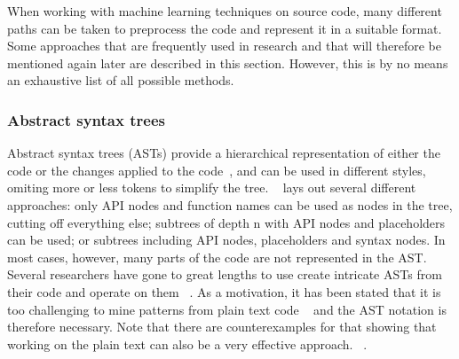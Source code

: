 \documentclass[
a4paper,
pagesize,
pdftex,
12pt,
twoside, %
BCOR=5mm, %
ngerman,
fleqn,
final,
]{scrartcl}
\begin{document}
	When working with machine learning techniques on source code, many different paths can be taken to preprocess the code and represent it in a suitable format. Some approaches that are frequently used in research and that will therefore be mentioned again later are described in this section. However, this is by no means an exhaustive list of all possible methods. 
	
	\subsubsection{Abstract syntax trees}
	Abstract syntax trees (ASTs) provide a hierarchical representation of either the code or the changes applied to the code~\cite{Liu.2018}, and can be used in different styles, omiting more or less tokens to simplify the tree. ~\cite{Yamaguchi.2012} lays out several different approaches: only API nodes and function names can be used as nodes in the tree, cutting off everything else; subtrees of depth n with API nodes and placeholders can be used; or subtrees including API nodes, placeholders and syntax nodes. In most cases, however, many parts of the code are not represented in the AST.\\ Several researchers have gone to great lengths to use create intricate ASTs from their code and operate on them ~\cite{Ma.2017,Yamaguchi.2012}. As a motivation, it has been stated that it is too challenging to mine patterns from plain text code ~\cite{Liu.2018} and the AST notation is therefore necessary. Note that there are counterexamples for that showing that working on the plain text can also be a very effective approach. ~\cite{Russell.2018,Hovsepyan.2012}.\\
	
\end{document}
